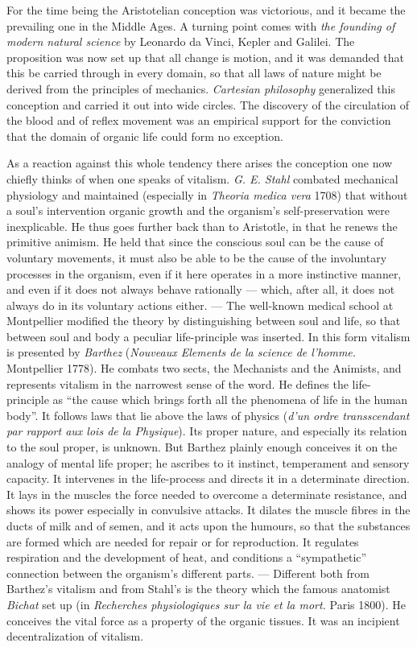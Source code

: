 \documentclass[12pt,a4paper]{article}
\begin{document}
For the time being the Aristotelian conception was victorious, and it became the
prevailing one in the Middle Ages. A turning point comes with \emph{the founding
of modern natural science} by Leonardo da Vinci, Kepler and Galilei. The
proposition was now set up that all change is motion, and it was demanded that
this be carried through in every domain, so that all laws of nature might be
derived from the principles of mechanics. \emph{Cartesian philosophy}
generalized this conception and carried it out into wide circles. The discovery
of the circulation of the blood and of reflex movement was an empirical support
for the conviction that the domain of organic life could form no exception.

As a reaction against this whole tendency there arises the conception one now
chiefly thinks of when one speaks of vitalism. \emph{G. E. Stahl} combated
mechanical physiology and maintained (especially in \textit{Theoria medica vera}
1708) that without a soul's intervention organic growth and the organism's
self-preservation were inexplicable. He thus goes further back than to
Aristotle, in that he renews the primitive animism. He held that since the
conscious soul can be the cause of voluntary movements, it must also be able to
be the cause of the involuntary processes in the organism, even if it here
operates in a more instinctive manner, and even if it does not
always behave rationally --- which, after all, it does not always do in its
voluntary actions either. --- The well-known medical school at Montpellier
modified the theory by distinguishing between soul and life, so that between
soul and body a peculiar life-principle was inserted. In this form vitalism is
presented by \emph{Barthez} (\textit{Nouveaux Elements de la science de
l'homme.} Montpellier 1778). He combats two sects, the Mechanists and the
Animists, and represents vitalism in the narrowest sense of the word. He defines
the life-principle as ``the cause which brings forth all the phenomena of life
in the human body''. It follows laws that lie above the laws of physics
(\textit{d'un ordre transscendant par rapport aux lois de la Physique}). Its
proper nature, and especially its relation to the soul proper, is unknown. But
Barthez plainly enough conceives it on the analogy of mental life proper; he
ascribes to it instinct, temperament and sensory capacity. It intervenes in the
life-process and directs it in a determinate direction. It lays in the muscles
the force needed to overcome a determinate resistance, and shows its power
especially in convulsive attacks. It dilates the muscle fibres in the ducts of
milk and of semen, and it acts upon the humours, so that the substances are
formed which are needed for repair or for reproduction. It regulates respiration
and the development of heat, and conditions a ``sympathetic'' connection between
the organism's different parts. --- Different both from Barthez's vitalism and
from Stahl's is the theory which the famous anatomist \emph{Bichat} set up (in
\textit{Recherches physiologiques sur la vie et la mort.} Paris 1800). He
conceives the vital force as a property of the organic tissues. It was an
incipient decentralization of vitalism.
\end{document}
